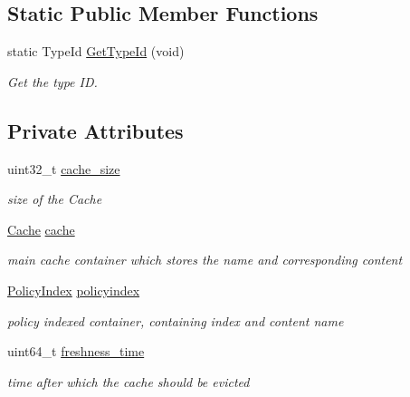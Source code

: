 \subsection*{Static Public Member Functions}
\begin{DoxyCompactItemize}
\item 
static Type\-Id \hyperlink{classns3_1_1CacheWithLFU_abdbb868fedff87f723423726c8f52d18}{Get\-Type\-Id} (void)
\begin{DoxyCompactList}\small\item\em Get the type I\-D. \end{DoxyCompactList}\end{DoxyCompactItemize}
\subsection*{Private Attributes}
\begin{DoxyCompactItemize}
\item 
uint32\-\_\-t \hyperlink{classns3_1_1CacheWithLFU_a79d5772bfd23f574af448f95c223417c}{cache\-\_\-size}
\begin{DoxyCompactList}\small\item\em size of the Cache \end{DoxyCompactList}\item 
\hyperlink{classns3_1_1NamedContentCache_a9aa35d883b9f4153d97b6e7dc74f9307}{Cache} \hyperlink{classns3_1_1CacheWithLFU_a8ab1e97d5de9b643e4b29f80e971294b}{cache}
\begin{DoxyCompactList}\small\item\em main cache container which stores the name and corresponding content \end{DoxyCompactList}\item 
\hyperlink{classns3_1_1NamedContentCache_a0b728ea2d4e0acbe431897b2374cfc8e}{Policy\-Index} \hyperlink{classns3_1_1CacheWithLFU_ae17cdaaa0686b2fd2171d98ad767eec5}{policyindex}
\begin{DoxyCompactList}\small\item\em policy indexed container, containing index and content name \end{DoxyCompactList}\item 
uint64\-\_\-t \hyperlink{classns3_1_1CacheWithLFU_a8301a27e2e133723a181782ed791c3b0}{freshness\-\_\-time}
\begin{DoxyCompactList}\small\item\em time after which the cache should be evicted \end{DoxyCompactList}\end{DoxyCompactItemize}
